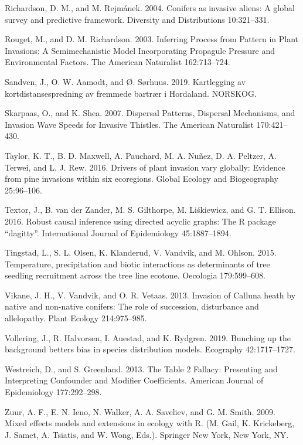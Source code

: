 \documentclass[
]{article}
\begin{document}
\leavevmode\hypertarget{ref-richardsonConifersInvasiveAliens2004}{}%
Richardson, D. M., and M. Rejmánek. 2004. Conifers as invasive aliens: A global survey and predictive framework. Diversity and Distributions 10:321--331.

\leavevmode\hypertarget{ref-rougetInferringProcessPattern2003}{}%
Rouget, M., and D. M. Richardson. 2003. Inferring Process from Pattern in Plant Invasions: A Semimechanistic Model Incorporating Propagule Pressure and Environmental Factors. The American Naturalist 162:713--724.

\leavevmode\hypertarget{ref-sandvenKartleggingAvKortdistansespredning2019}{}%
Sandven, J., O. W. Aamodt, and Ø. Sørhuus. 2019. Kartlegging av kortdistansespredning av fremmede bartrær i Hordaland. NORSKOG.

\leavevmode\hypertarget{ref-skarpaasDispersalPatternsDispersal2007}{}%
Skarpaas, O., and K. Shea. 2007. Dispersal Patterns, Dispersal Mechanisms, and Invasion Wave Speeds for Invasive Thistles. The American Naturalist 170:421--430.

\leavevmode\hypertarget{ref-taylorDriversPlantInvasion2016}{}%
Taylor, K. T., B. D. Maxwell, A. Pauchard, M. A. Nuñez, D. A. Peltzer, A. Terwei, and L. J. Rew. 2016. Drivers of plant invasion vary globally: Evidence from pine invasions within six ecoregions. Global Ecology and Biogeography 25:96--106.

\leavevmode\hypertarget{ref-textorRobustCausalInference2016}{}%
Textor, J., B. van der Zander, M. S. Gilthorpe, M. Liśkiewicz, and G. T. Ellison. 2016. Robust causal inference using directed acyclic graphs: The R package ``dagitty''. International Journal of Epidemiology 45:1887--1894.

\leavevmode\hypertarget{ref-tingstadTemperaturePrecipitationBiotic2015}{}%
Tingstad, L., S. L. Olsen, K. Klanderud, V. Vandvik, and M. Ohlson. 2015. Temperature, precipitation and biotic interactions as determinants of tree seedling recruitment across the tree line ecotone. Oecologia 179:599--608.

\leavevmode\hypertarget{ref-vikaneInvasionCallunaHeath2013}{}%
Vikane, J. H., V. Vandvik, and O. R. Vetaas. 2013. Invasion of Calluna heath by native and non-native conifers: The role of succession, disturbance and allelopathy. Plant Ecology 214:975--985.

\leavevmode\hypertarget{ref-volleringBunchingBackgroundBetters2019}{}%
Vollering, J., R. Halvorsen, I. Auestad, and K. Rydgren. 2019. Bunching up the background betters bias in species distribution models. Ecography 42:1717--1727.

\leavevmode\hypertarget{ref-westreichTableFallacyPresenting2013}{}%
Westreich, D., and S. Greenland. 2013. The Table 2 Fallacy: Presenting and Interpreting Confounder and Modifier Coefficients. American Journal of Epidemiology 177:292--298.

\leavevmode\hypertarget{ref-zuurMixedEffectsModels2009}{}%
Zuur, A. F., E. N. Ieno, N. Walker, A. A. Saveliev, and G. M. Smith. 2009. Mixed effects models and extensions in ecology with R. (M. Gail, K. Krickeberg, J. Samet, A. Tsiatis, and W. Wong, Eds.). Springer New York, New York, NY.
\end{document}
